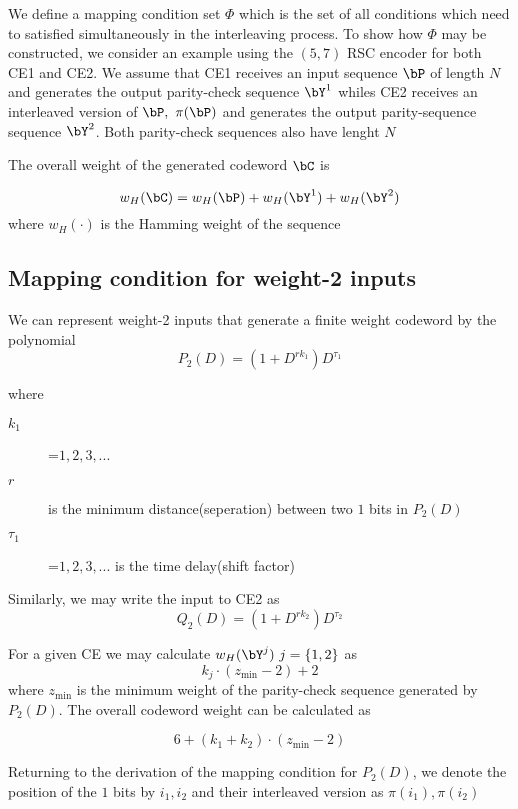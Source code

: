 \documentclass[11pt, oneside, dvipdfmx]{book}
\begin{document}
 We define a mapping condition set $\Phi$ which is the set of all conditions which need to satisfied simultaneously in the interleaving process. To show how $\Phi$ may be constructed, we consider an example using the $(5,7)$ RSC encoder for both CE1 and CE2. We assume that CE1 receives an input sequence $\bP$ of length $N$ and generates the output parity-check sequence $\bY^1$ whiles CE2 receives an interleaved version of $\bP,~\pi(\bP)$ and generates the output parity-sequence sequence $\bY^2$. Both parity-check sequences also have lenght $N$
 
 The overall weight of the generated codeword $\bC$ is 
 
 \begin{equation}
 w_H(\bC) =w_H(\bP)+w_H(\bY^1)+w_H(\bY^2)
 \end{equation}
 where $w_H(\cdot)$ is the Hamming weight of the sequence
 
 \subsection{Mapping condition for weight-2 inputs}
 We can represent weight-2 inputs that generate a finite weight codeword by the polynomial $$ P_2(D) =(1 +D^{rk_1})D^{\tau_1}$$
 
 where 
 
 \begin{description}
 \item[$k_1$] =$1,2,3,...$
 \item[$r$] is the minimum distance(seperation) between two $1$ bits in $P_2(D)$
 \item[$\tau_1$] =$1,2,3,...$ is the time delay(shift factor)
 \end{description}
 
 Similarly, we may write the input to CE2 as $$ Q_2(D) =(1 +D^{rk_2})D^{\tau_2}$$
 
 For a given CE we may calculate $w_H(\bY^j)~j=\{1,2\}$ as 
 \begin{equation}
 k_j \cdot (z_{\min}-2)+2
 \end{equation} 
 where $z_{\min}$ is the minimum
weight of the parity-check sequence generated by $P_2(D)$. The overall codeword weight can be calculated as 

\begin{equation}
6+(k_1+k_2) \cdot (z_{\min}-2)
\label{14}
\end{equation}

Returning to the derivation of the mapping condition for $P_2(D)$, we denote the position of the $1$ bits by $i_1,i_2$ and their interleaved version as $\pi(i_1),\pi(i_2)$ 
\end{document}
